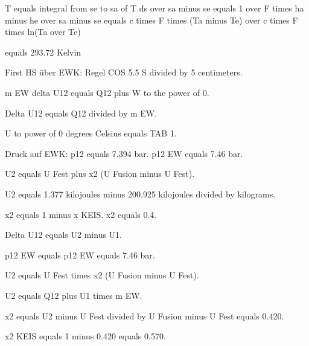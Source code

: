 T equals integral from se to sa of T ds over sa minus se equals 1 over F times ha minus he over sa minus se equals c times F times (Ta minus Te) over c times F times ln(Ta over Te)

equals 293.72 Kelvin

First HS über EWK: Regel COS 5.5 S divided by 5 centimeters.

m EW delta U12 equals Q12 plus W to the power of 0.

Delta U12 equals Q12 divided by m EW.

U to power of 0 degrees Celsius equals TAB 1.

Druck auf EWK: p12 equals 7.394 bar. p12 EW equals 7.46 bar.

U2 equals U Fest plus x2 (U Fusion minus U Fest).

U2 equals 1.377 kilojoules minus 200.925 kilojoules divided by kilograms.

x2 equals 1 minus x KEIS. x2 equals 0.4.

Delta U12 equals U2 minus U1.

p12 EW equals p12 EW equals 7.46 bar.

U2 equals U Fest times x2 (U Fusion minus U Fest).

U2 equals Q12 plus U1 times m EW.

x2 equals U2 minus U Fest divided by U Fusion minus U Fest equals 0.420.

x2 KEIS equals 1 minus 0.420 equals 0.570.